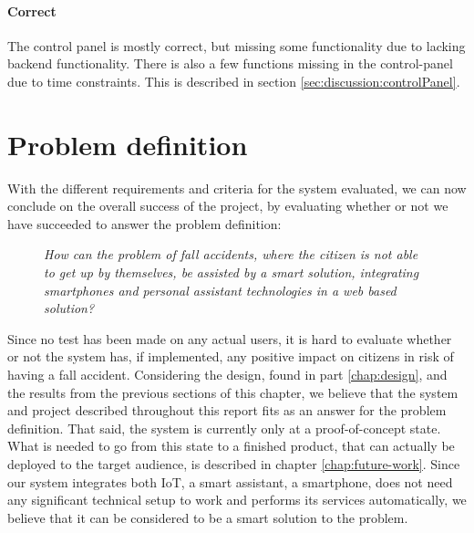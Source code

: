 \paragraph{Correct}
The control panel is mostly correct, but missing some functionality due to lacking backend functionality. There is also a few functions missing in the control-panel due to time constraints. This is described in section \ref{sec:discussion:controlPanel}.

\section{Problem definition}
With the different requirements and criteria for the system evaluated, we can now conclude on the overall success of the project, by evaluating whether or not we have succeeded to answer the problem definition:

\begin{figure}[H]
    \begin{center}
        \textit{How can the problem of fall accidents, where the citizen is not able to get up by themselves, be assisted by a smart solution, integrating smartphones and personal assistant technologies in a web based solution?}
    \end{center}
\end{figure}

Since no test has been made on any actual users, it is hard to evaluate whether or not the system has, if implemented, any positive impact on citizens in risk of having a fall accident. Considering the design, found in part \ref{chap:design}, and the results from the previous sections of this chapter, we believe that the system and project described throughout this report fits as an answer for the problem definition. That said, the system is currently only at a proof-of-concept state. What is needed to go from this state to a finished product, that can actually be deployed to the target audience, is described in chapter \ref{chap:future-work}. Since our system integrates both IoT, a smart assistant, a smartphone, does not need any significant technical setup to work and performs its services automatically, we believe that it can be considered to be a smart solution to the problem.